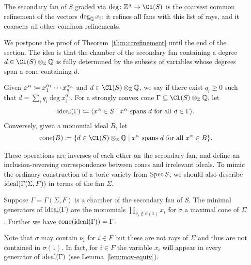 \documentclass{article}
\begin{document}
\begin{thm}\label{thm:ccrefinement}
  The secondary fan of $S$ graded via $\deg\colon\ZZ^n\to\Cl(S)$ is the coarsest common refinement of the vectors $\deg_\mathbb Q x_i$: it refines all fans with this list of rays, and it coarsens all other common refinements.
\end{thm}

We postpone the proof of Theorem~\ref{thm:ccrefinement} until the end of the section.  The idea is that the chamber of the secondary fan containing a degree $d\in\Cl(S)\otimes_\ZZ\QQ$ is fully determined by the subsets of variables whose degrees span a cone containing $d$.

    \begin{defn}\label{def:ideal-cone}
      Given $x^\alpha \coloneqq x_1^{\alpha_1}\cdots x_n^{\alpha_n}$ and $d\in \Cl(S)\otimes_\ZZ\QQ$, we say  if there exist $q_i\geq 0$ such that $d = \sum_{i} q_i\deg x_i^{\alpha_i}$.  For a strongly convex cone $\Gamma \subseteq \Cl(S)\otimes_\ZZ \QQ$, let
      \[
      \operatorname{ideal}(\Gamma) \coloneqq \langle x^\alpha\in S\mid x^\alpha \text{ spans } d \text{ for all } d\in \Gamma\rangle.
      \]
      Conversely, given a monomial ideal $B$, let
      \[
      \coneof(B) \ce \{ d\in\Cl(S)\otimes_\ZZ\QQ\mid x^\alpha \text{ spans } d\text{ for all } x^\alpha\in B\}.
      \]
    \end{defn}
    
    These operations are inverses of each other on the secondary fan, and define an inclusion-reversing correspondence between cones and irrelevant ideals.  To mimic the ordinary construction of a toric variety from $\operatorname{Spec} S$, we should also describe $\operatorname{ideal}(\Gamma(\Sigma,F))$ in terms of the fan $\Sigma$.
    
\begin{prop}\label{prop:chamber-of-ideal}
  Suppose $\Gamma=\Gamma(\Sigma,F)$ is a chamber of the secondary fan of $S$.  The minimal generators of $\operatorname{ideal}(\Gamma)$ are the monomials $\prod_{\nu_i\notin\sigma(1)}x_i$ for $\sigma$ a maximal cone of $\Sigma$.  Further we have $\operatorname{cone}(\operatorname{ideal}(\Gamma))=\Gamma$.
\end{prop}

Note that $\sigma$ may contain $\nu_i$ for $i\in F$ but these are not rays of $\Sigma$ and thus are not contained in $\sigma(1)$.  In fact, for $i\in F$ the variable $x_i$ will appear in every generator of $\operatorname{ideal}(\Gamma)$ (see Lemma~\ref{lem:mov-equiv}).
\end{document}
